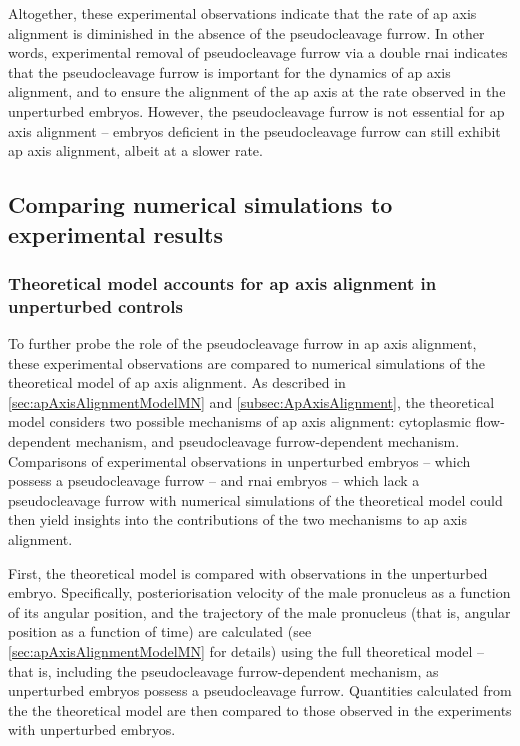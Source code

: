 Altogether, these experimental observations indicate that the rate of \ac{ap} axis alignment is diminished in the absence of the pseudocleavage furrow. In other words, experimental removal of pseudocleavage furrow via a double  \ac{rnai} indicates that the pseudocleavage furrow is important for the dynamics of \ac{ap} axis alignment, and to ensure the alignment of the \ac{ap} axis at the rate observed in the unperturbed embryos. However, the pseudocleavage furrow is not essential for \ac{ap} axis alignment -- embryos deficient in the pseudocleavage furrow can still exhibit \ac{ap} axis alignment, albeit at a slower rate.

\FloatBarrier
\subsection{Comparing numerical simulations to experimental results}\label{subsec:expVsTheoryPcFurrow}
\subsubsection{Theoretical model accounts for \acs{ap} axis alignment in unperturbed controls}\label{subsubsec:fullModelForWT}
To further probe the role of the pseudocleavage furrow in \ac{ap} axis alignment, these experimental observations are compared to numerical simulations of the theoretical model of \ac{ap} axis alignment. As described in \autoref{sec:apAxisAlignmentModelMN} and \autoref{subsec:ApAxisAlignment}, the theoretical model considers two possible mechanisms of \ac{ap} axis alignment: cytoplasmic flow-dependent mechanism, and pseudocleavage furrow-dependent mechanism. Comparisons of experimental observations in unperturbed embryos -- which possess a pseudocleavage furrow -- and  \ac{rnai} embryos -- which lack a pseudocleavage furrow with numerical simulations of the theoretical model could then yield insights into the contributions of the two mechanisms to \ac{ap} axis alignment.

First, the theoretical model is compared with observations in the unperturbed embryo. Specifically, posteriorisation velocity of the male pronucleus as a function of its angular position, and the trajectory of the male pronucleus (that is, angular position as a function of time) are calculated (see \autoref{sec:apAxisAlignmentModelMN} for details) using the full theoretical model -- that is, including the pseudocleavage furrow-dependent mechanism, as unperturbed embryos possess a pseudocleavage furrow. Quantities calculated from the the theoretical model are then compared to those observed in the experiments with unperturbed embryos. 

